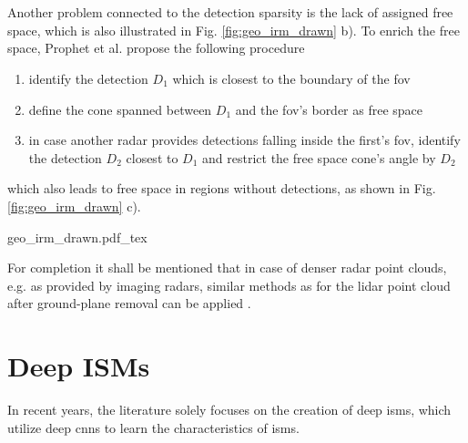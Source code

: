 \\\\
Another problem connected to the detection sparsity is the lack of assigned free space, which is also illustrated in Fig. \ref{fig:geo_irm_drawn} b). To enrich the free space, Prophet et al. \cite{prophet2018adaptions} propose the following procedure
\begin{enumerate}[noitemsep,nolistsep,topsep=0pt]
	\item identify the detection $D_1$ which is closest to the boundary of the \gls{fov}
	\item define the cone spanned between $D_1$ and the \gls{fov}'s border as free space
	\item in case another radar provides detections falling inside the first's \gls{fov}, identify the detection $D_2$ closest to $D_1$ and restrict the free space cone's angle by $D_2$   
\end{enumerate}
which also leads to free space in regions without detections, as shown in Fig. \ref{fig:geo_irm_drawn} c).
\begin{center}
	{geo_irm_drawn.pdf_tex}
\end{center}
For completion it shall be mentioned that in case of denser radar point clouds, e.g. as provided by imaging radars, similar methods as for the lidar point cloud after ground-plane removal can be applied \cite{slutsky2019dual}.
%
\section{Deep ISMs}
\label{sec:deep_isms}
In recent years, the literature solely focuses on the creation of deep \gls{ism}s, which utilize deep \gls{cnn}s to learn the characteristics of \gls{ism}s. 
%
